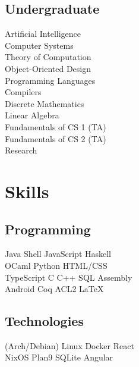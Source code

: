 \documentclass[letterpaper]{resume} %
\begin{document}
\begin{minipage}[t]{0.33\textwidth}
\subsection{Undergraduate}
Artificial Intelligence \\
Computer Systems \\
Theory of Computation \\
Object-Oriented Design \\
Programming Languages \\
Compilers \\
Discrete Mathematics \\
Linear Algebra \\
Fundamentals of CS 1 (TA) \\
Fundamentals of CS 2 (TA) \\

Research
\sectionspace


\section{Skills}

\subsection{Programming}
Java \textbullet{} Shell \textbullet{} JavaScript \textbullet{} Haskell \\
OCaml \textbullet{} Python \textbullet{} HTML/CSS \\
TypeScript \textbullet{}  C \textbullet{} C++ \textbullet{} SQL \textbullet{} Assembly \\
Android  \textbullet{} Coq \textbullet{} ACL2 \textbullet{} \LaTeX\ \\
\sectionspace

\subsection{Technologies}
(Arch/Debian) Linux  \textbullet{} Docker \textbullet{} React \\
NixOS \textbullet{} Plan9 \textbullet{} SQLite \textbullet{} Angular \\
\sectionspace

\end{minipage} %
\end{document}

